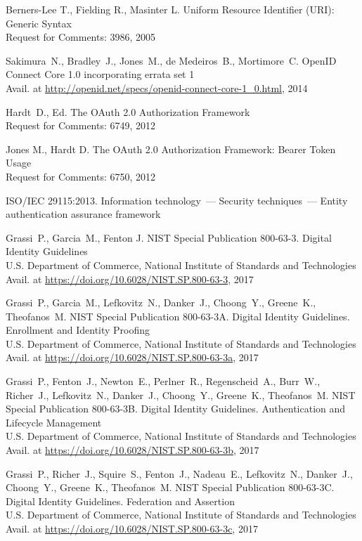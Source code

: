 \clearpage
\begin{thebibliography}{99}

Berners-Lee T., Fielding R., Masinter L. 
Uniform Resource Identifier (URI): Generic Syntax\\
{\small Request for Comments: 3986, 2005}

Sakimura~N., Bradley~J., Jones~M., de Medeiros~B., Mortimore~C. 
OpenID Connect Core 1.0 incorporating errata set 1\\
{\small Avail. at 
\url{http://openid.net/specs/openid-connect-core-1_0.html}, 2014}

Hardt~D., Ed.
The OAuth 2.0 Authorization Framework\\
{\small Request for Comments: 6749, 2012}

Jones M., Hardt D.
The OAuth 2.0 Authorization Framework: Bearer Token Usage\\
{\small Request for Comments: 6750, 2012}

ISO/IEC 29115:2013. Information technology~---
Security techniques~--– Entity authentication assurance framework

Grassi~P., Garcia~M., Fenton J.
NIST Special Publication 800-63-3. Digital Identity Guidelines\\
U.S. Department of Commerce, National Institute of Standards and Technologies
{\small Avail. at \url{https://doi.org/10.6028/NIST.SP.800-63-3}, 2017}

Grassi~P., Garcia~M., 
Lefkovitz~N., Danker~J., 
Choong~Y., Greene~K., Theofanos~M. 
NIST Special Publication 800-63-3A. Digital Identity Guidelines. Enrollment and 
Identity Proofing\\ 
U.S. Department of Commerce, National Institute of Standards and Technologies
{\small Avail. at \url{https://doi.org/10.6028/NIST.SP.800-63-3a}, 2017}

Grassi~P., Fenton~J., Newton~E., Perlner~R., Regenscheid~A., Burr~W., Richer~J., 
Lefkovitz~N., Danker~J., 
Choong~Y., Greene~K., Theofanos~M. 
NIST Special Publication 800-63-3B. Digital Identity Guidelines. 
Authentication and Lifecycle Management\\ 
U.S. Department of Commerce, National Institute of Standards and Technologies
{\small Avail. at \url{https://doi.org/10.6028/NIST.SP.800-63-3b}, 2017}

Grassi~P., Richer~J., Squire~S., Fenton~J., Nadeau~E., 
Lefkovitz~N., Danker~J., 
Choong~Y., Greene~K., Theofanos~M.
NIST Special Publication 800-63-3C. Digital Identity Guidelines. 
Federation and Assertion\\ 
U.S. Department of Commerce, National Institute of Standards and Technologies
{\small Avail. at 
\url{https://doi.org/10.6028/NIST.SP.800-63-3c}, 2017}


\end{thebibliography}
